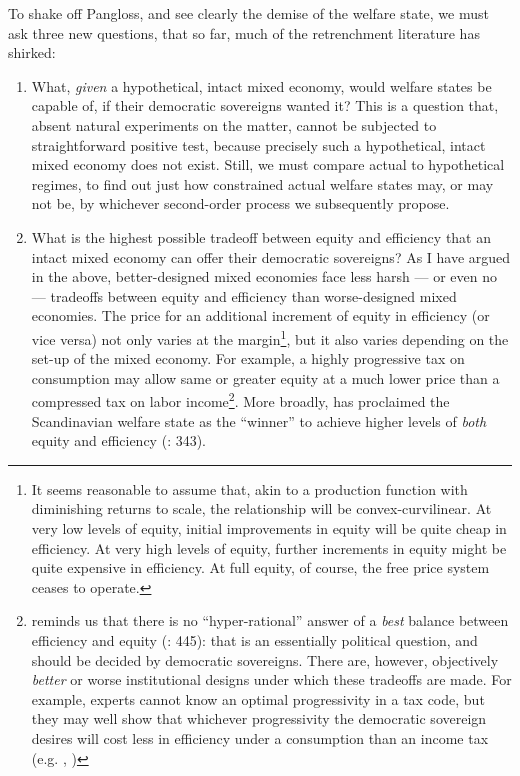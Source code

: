 \documentclass[11pt,a4paper,oneside,openright]{article}
\begin{document}

To shake off Pangloss, and see clearly the demise of the welfare state, we must ask three new questions, that so far, much of the retrenchment literature has shirked:
\begin{enumerate}
	\item What, \emph{given} a hypothetical, intact mixed economy, would welfare states be capable of, if their democratic sovereigns wanted it? 
	This is a question that, absent natural experiments on the matter, cannot be subjected to straightforward positive test, because precisely such a hypothetical, intact mixed economy does not exist. 
	Still, we must compare actual to hypothetical regimes, to find out just how constrained actual welfare states may, or may not be, by whichever second-order process we subsequently propose.
	
	\item What is the highest possible tradeoff between equity and efficiency that an intact mixed economy can offer their democratic sovereigns? 
	As I have argued in the above, better-designed mixed economies face less harsh --- or even no --- tradeoffs between equity and efficiency than worse-designed mixed economies. 
	The price for an additional increment of equity in efficiency (or vice versa) not only varies at the margin\footnote{
		It seems reasonable to assume that, akin to a production function with diminishing returns to scale, the relationship will be convex-curvilinear. 
		At very low levels of equity, initial improvements in equity will be quite cheap in efficiency. 
		At very high levels of equity, further increments in equity might be quite expensive in efficiency. 
		At full equity, of course, the free price system ceases to operate.}, 
	but it also varies depending on the set-up of the mixed economy. 
	For example, a highly progressive tax on consumption may allow same or greater equity at a much lower price than a compressed tax on labor income\footnote{
		\citeauthor{Offe2003} reminds us that there is no ``hyper-rational'' answer of a \emph{best} balance between efficiency and equity (\citeyear{Offe2003}: 445): 
		that is an essentially political question, and should be decided by democratic sovereigns. 
		There are, however, objectively \emph{better} or {worse} institutional designs under which these tradeoffs are made. 
		For example, experts cannot know an optimal progressivity in a tax code, but they may well show that whichever progressivity the democratic sovereign desires will cost less in efficiency under a consumption than an income tax (e.g. \citealt{McCaffery2005}, \citealt{Frank2005})}.
	More broadly, \citeauthor{Ganßmann2010} has proclaimed the Scandinavian welfare state as the ``winner'' to achieve higher levels of \emph{both} equity and efficiency (\citeyear{Ganßmann2010}: 343). 
	

\end{enumerate}
\end{document}

